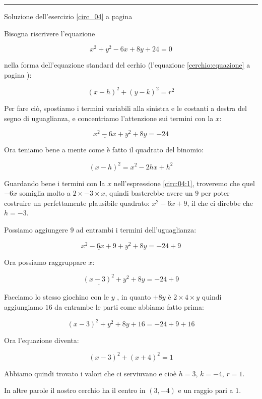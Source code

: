 \vspace{1cm}
\hrule
\vspace{1cm}


Soluzione dell'esercizio \ref{circ_04} a pagina \pageref{circ_04}\label{circs_04}

\vspace{1cm}

Bisogna riscrivere l'equazione 

\[
x^2+y^2-6x+8y+24=0 
\]

nella forma dell'equazione standard del cerhio (l'equazione \ref{cerchio:equazione} a pagina \pageref{cerchio:equazione}):


\[
(x-h)^2+(y-k)^2=r^2
\]

Per fare ciò, spostiamo i termini variabili alla sinistra e le costanti a destra del segno di uguaglianza, e concentriamo l'attenzione sui termini con la $x$:

\begin{equation} \label{circ:04:1}
\underline{x^2-6x}+y^2+8y=-24
\end{equation}

Ora teniamo bene a mente come è fatto il quadrato del binomio:

\[
(x-h)^2 = x^2-2hx +h^2
\]

Guardando bene i termini con la $x$ nell'espressione \ref{circ:04:1}, troveremo che quel $-6x$ somiglia molto a $2\times -3\times x$, quindi basterebbe avere un $9$ per poter costruire un perfettamente plausibile quadrato: $x^2-6x+9$, il che ci direbbe che $h=-3$.

Possiamo aggiungere $9$ ad entrambi i termini dell'uguaglianza:


\[
\underline{x^2
-6x
+9
}
+y^2
+8y=-24 + 9 
\]

Ora possiamo raggruppare $x$:


\[
\underline{(x-3)^2 }
+y^2
+8y=-24 + 9 
\]

Facciamo lo stesso giochino con le $y$ , in quanto $+8y$ è $2\times 4 \times y$ quindi aggiungiamo $16$ da entrambe le parti come abbiamo fatto prima:

\[
(x-3)^2 
+y^2
+8y
+16
=-24 + 9 +16
\]

Ora l'equazione diventa:

\[
(x-3)^2+ 
(x+4)^2
=1
\]


Abbiamo quindi trovato i valori che ci serviuvano e cioè $h=3$, $k=-4$, $r=1$.

In altre parole il nostro cerchio ha il centro in $(3,-4)$ e un raggio pari a $1$.



